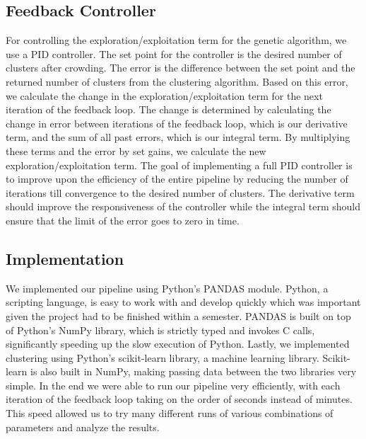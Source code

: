 \documentclass{sig-alternate}
\begin{document}
\subsection{Feedback Controller}
For controlling the exploration/exploitation term for the genetic algorithm, we use a PID controller. The set point for the controller is the desired number of clusters after crowding. The error is the difference between the set point and the returned number of clusters from the clustering algorithm. Based on this error, we calculate the change in the exploration/exploitation term for the next iteration of the feedback loop. The change is determined by calculating the change in error between iterations of the feedback loop, which is our derivative term, and the sum of all past errors, which is our integral term. By multiplying these terms and the error by set gains, we calculate the new exploration/exploitation term. The goal of implementing a full PID controller is to improve upon the efficiency of the entire pipeline by reducing the number of iterations till convergence to the desired number of clusters. The derivative term should improve the responsiveness of the controller while the integral term should ensure that the limit of the error goes to zero in time.

\subsection{Implementation}
We implemented our pipeline using Python's PANDAS module. Python, a scripting language, is easy to work with and develop quickly which was important given the project had to be finished within a semester. PANDAS is built on top of Python's NumPy library, which is strictly typed and invokes C calls, significantly speeding up the slow execution of Python. Lastly, we implemented clustering using Python's scikit-learn library, a machine learning library. Scikit-learn is also built in NumPy, making passing data between the two libraries very simple. In the end we were able to run our pipeline very efficiently, with each iteration of the feedback loop taking on the order of seconds instead of minutes. This speed allowed us to try many different runs of various combinations of parameters and analyze the results.
\end{document}
